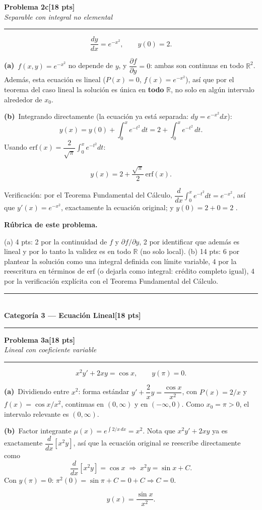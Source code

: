 \documentclass[11pt,letterpaper]{article}
\newcommand{\categoria}[3]{%
  \bigskip\bigskip\noindent
  \rule{\linewidth}{0.8pt}\\[2pt]
  {\Large\bfseries Categoría #1 --- #2}\hfill\textbf{[#3 pts]}\\[2pt]
  \rule{\linewidth}{0.8pt}\vspace{4pt}
}
\newcommand{\problema}[3]{%
  \bigskip\noindent
  {\large\textbf{Problema #1}}\hfill\textbf{[#2 pts]}\\[3pt]
  {\small\itshape #3}\par
  \vspace{2pt}\hrule\vspace{8pt}
}
\newcommand{\subparte}[2]{%
  \medskip\noindent\textbf{(#1}\ #2\par\smallskip
}
\newenvironment{resultado}
  {\begin{mdframed}[linecolor=black,linewidth=0.6pt,
    innerleftmargin=6pt,innerrightmargin=6pt,innertopmargin=4pt,innerbottommargin=4pt]
   \bfseries}
  {\end{mdframed}}
\newenvironment{rubrica}{%
  \begin{mdframed}[linecolor=black,linewidth=0.6pt,
    innerleftmargin=8pt,innerrightmargin=8pt,innertopmargin=5pt,innerbottommargin=5pt]
  \small\textbf{Rúbrica de este problema.}\par\smallskip
}{\end{mdframed}}
\begin{document}
\newpage
\problema{2c}{18}{Separable con integral no elemental}

\[
\frac{dy}{dx}=e^{-x^2}, \qquad y(0)=2.
\]

\subparte{a)}{$f(x,y)=e^{-x^2}$ no depende de $y$, y $\dfrac{\partial f}{\partial y}=0$: ambas son continuas en todo $\mathbb{R}^2$. Además, esta ecuación es lineal ($P(x)=0$, $f(x)=e^{-x^2}$), así que por el teorema del caso lineal la solución es única en \textbf{todo} $\mathbb{R}$, no solo en algún intervalo alrededor de $x_0$.}

\subparte{b)}{Integrando directamente (la ecuación ya está separada: $dy = e^{-x^2}dx$):
\[
y(x) = y(0) + \int_0^x e^{-t^2}\,dt = 2+\int_0^x e^{-t^2}\,dt.
\]
Usando $\text{erf}(x)=\dfrac{2}{\sqrt\pi}\displaystyle\int_0^x e^{-t^2}dt$:
\begin{resultado}
\[
y(x) = 2 + \frac{\sqrt\pi}{2}\,\text{erf}(x).
\]
\end{resultado}
Verificación: por el Teorema Fundamental del Cálculo, $\dfrac{d}{dx}\displaystyle\int_0^x e^{-t^2}dt = e^{-x^2}$, así que $y'(x)=e^{-x^2}$, exactamente la ecuación original; y $y(0)=2+0=2$ \checkmark.}

\begin{rubrica}
(a) 4 pts: 2 por la continuidad de $f$ y $\partial f/\partial y$, 2 por identificar que además es lineal y por lo tanto la validez es en todo $\mathbb{R}$ (no solo local). (b) 14 pts: 6 por plantear la solución como una integral definida con límite variable, 4 por la reescritura en términos de $\text{erf}$ (o dejarla como integral: crédito completo igual), 4 por la verificación explícita con el Teorema Fundamental del Cálculo.
\end{rubrica}

\newpage
\categoria{3}{Ecuación Lineal}{18}

\problema{3a}{18}{Lineal con coeficiente variable}

\[
x^2y'+2xy=\cos x, \qquad y(\pi)=0.
\]

\subparte{a)}{Dividiendo entre $x^2$: forma estándar $y'+\dfrac2x y = \dfrac{\cos x}{x^2}$, con $P(x)=2/x$ y $f(x)=\cos x/x^2$, continuas en $(0,\infty)$ y en $(-\infty,0)$. Como $x_0=\pi>0$, el intervalo relevante es $(0,\infty)$.}

\subparte{b)}{Factor integrante $\mu(x)=e^{\int 2/x\,dx}=x^2$. Nota que $x^2y'+2xy$ ya es exactamente $\dfrac{d}{dx}[x^2y]$, así que la ecuación original se reescribe directamente como
\[
\frac{d}{dx}\left[x^2y\right] = \cos x \;\Longrightarrow\; x^2y=\sin x+C.
\]
Con $y(\pi)=0$: $\pi^2(0)=\sin\pi+C=0+C \Rightarrow C=0$.
\begin{resultado}
\[
y(x) = \frac{\sin x}{x^2}.
\]
\end{resultado}}
\end{document}
